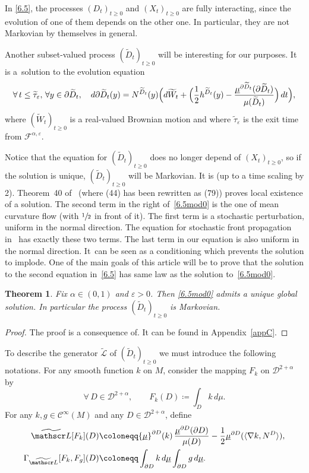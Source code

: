 \documentclass[10pt]{amsart}
\let\epsilon\varepsilon
\theoremstyle{plain}
\newtheorem{thm}{Theorem}[section]
\theoremstyle{definition}
\newcommand{\SL}{{\mathscr L}}
\newcommand\df{\coloneqq}
\newcommand{\bq}{\begin{equation*}}
\newcommand{\eq}{\end{equation*}}
\newcommand{\fo}{\forall\,}
\newcommand{\usm}{{\underline{\smash{\mu}}}}
\let\f\frac
\let\a\alpha
\let\e\varepsilon
\let\n\nabla
\let\pa\partial
\let\wi\widetilde
\let\iy\infty
\newcommand{\cC}{\mathcal{C}}
\newcommand{\cD}{\mathcal{D}}
\newcommand{\cF}{\mathcal{F}}
\begin{document}
\par
In \eqref{6.5}, the processes $(D_t)_{t\geq 0}$
and $(X_t)_{t\geq 0}$ are fully interacting, since the evolution of one of them depends on the other one.
In particular, they are not Markovian by themselves in general.
\par
Another subset-valued process $(\wi D_t)_{t\geq 0}$ will be interesting for our purposes. It is a~solution to the evolution equation
\begin{equation}\label{6.5mod0}
\fo t\leq \wi\tau_\epsilon,\, \forall y\in \partial \wi D_t,\quad
d\partial \wi D_t(y)=N^{\wi D_t}(y)\Bigl(d\wi W_t+\Bigl(\f12 h^{\wi D_t}(y)-\f{\usm^{\partial\wi D_t}(\partial\wi D_t)}{\mu(\wi D_t)}\Bigr)\,dt\Bigr),
\end{equation}
where $(\wi W_t)_{t\geq 0}$ is a real-valued Brownian motion and where $\wi\tau_\epsilon$ is the exit time from $\cF^{\alpha,\epsilon}$.
\par
Notice that the equation for $(\wi D_t)_{t\geq 0}$ does no longer depend of $(X_t)_{t\geq 0}$, so if the solution is unique, $(\wi D_t)_{t\geq 0}$ will be Markovian.
It is \cite[Eq.\,(44)]{zbMATH07470497} (up to a time scaling by 2). Theorem~40 of~\cite{zbMATH07470497} (where (44) has been rewritten as (79)) proves local existence of a solution. The second term in the right of~\eqref{6.5mod0} is the one of mean curvature flow (with $\sfrac12$ in front of it). The first term is a stochastic perturbation, uniform in the normal direction. The equation for stochastic front propagation in~\cite{GGLS:22} has exactly these two terms. The last term in our equation is also uniform in the normal direction. It~can be seen as a conditioning which prevents the solution to implode. One of the main goals of this article will be to prove that the solution to the second equation in~\eqref{6.5} has same law as the solution to~\eqref{6.5mod0}.
\begin{thm}\label{6.5mod0hyp}
Fix $\a\in (0,1)$ and $\e>0$. Then \eqref{6.5mod0} admits a unique
global solution. In particular the process $(\wi D_t)_{t\geq 0}$ is Markovian.
\end{thm}
\begin{proof}
The proof is a consequence of\cite[Th.\,22]{zbMATH07470497}. It can be found in Appendix~\ref{appC}.
\end{proof}
\par
To describe the generator $\wi\SL$ of $(\wi D_t)_{t\geq 0}$ we must introduce the following notations.
For any smooth function $k$ on $M$, consider the mapping $F_k$ on $\cD^{2+\alpha}$ by
\bq
\fo D\in \cD^{2+\alpha},\qquad F_k(D)\df \int_D k\, d\mu.
\eq
For any $k,g\in \cC^\iy(M)$ and any $D\in \cD^{2+\alpha}$, define
\begin{align}
\label{6.7}
\wi \SL[F_k](D)&\df \usm^{\partial D}(k)\,\f{\usm^{\partial D}(\partial D)}{\mu(D)}-\f12 \usm^{\partial D}(\langle \n k, N^D\rangle ),\\
\label{6.7b}\Gamma_{\wi\SL}[F_k, F_g](D)&\df \int_{\pa D} k\, d\usm\int_{\pa D} g\, d\usm.
\end{align}
\end{document}
